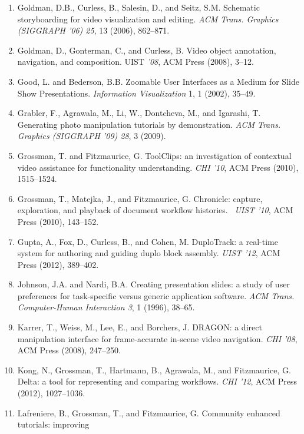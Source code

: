 \begin{enumerate}
\item \label{bkm:Ref240353779}Goldman, D.B., Curless, B., Salesin, D., and Seitz, S.M. Schematic storyboarding for video
visualization and editing. \textit{ACM Trans. Graphics (SIGGRAPH ’06) 25}, 13 (2006), 862–871.
\item \label{bkm:Ref240443389}Goldman, D., Gonterman, C., and Curless, B. Video object annotation, navigation, and
composition. UIST \textit{’08}, ACM Press (2008), 3–12.
\item \label{bkm:Ref240137574}Good, L. and Bederson, B.B. Zoomable User Interfaces as a Medium for Slide Show
Presentations. \textit{Information Visualization} 1, 1 (2002), 35–49.
\item \label{bkm:Ref240444524}Grabler, F., Agrawala, M., Li, W., Dontcheva, M., and Igarashi, T. Generating photo
manipulation tutorials by demonstration. \textit{ACM Trans. Graphics (SIGGRAPH ’09) 28}, 3 (2009).
\item \label{bkm:Ref240108208}Grossman, T. and Fitzmaurice, G. ToolClips: an investigation of contextual video
assistance for functionality understanding. \textit{CHI ’10}, ACM Press (2010), 1515–1524.
\item \label{bkm:Ref240107855}Grossman, T., Matejka, J., and Fitzmaurice, G. Chronicle: capture, exploration, and
playback of document workflow histories. ~\textit{UIST ’10}, ACM Press (2010), 143–152.
\item \label{bkm:Ref240108348}Gupta, A., Fox, D., Curless, B., and Cohen, M. DuploTrack: a real-time system for
authoring and guiding duplo block assembly. \textit{UIST ’12}, ACM Press (2012), 389–402.
\item \label{bkm:Ref240137598}Johnson, J.A. and Nardi, B.A. Creating presentation slides: a study of user preferences
for task-specific versus generic application software. \textit{ACM Trans. Computer-Human Interaction 3}, 1 (1996),
38–65.
\item \label{bkm:Ref240444787}Karrer, T., Weiss, M., Lee, E., and Borchers, J. DRAGON: a direct manipulation interface
for frame-accurate in-scene video navigation. \textit{CHI ’08}, ACM Press (2008), 247–250.
\item \label{bkm:Ref240451805}Kong, N., Grossman, T., Hartmann, B., Agrawala, M., and Fitzmaurice, G. Delta: a tool for
representing and comparing workflows. \textit{CHI ’12}, ACM Press (2012), 1027–1036.
\item \label{bkm:Ref240108293}Lafreniere, B., Grossman, T., and Fitzmaurice, G. Community enhanced tutorials: improving

\end{enumerate}
